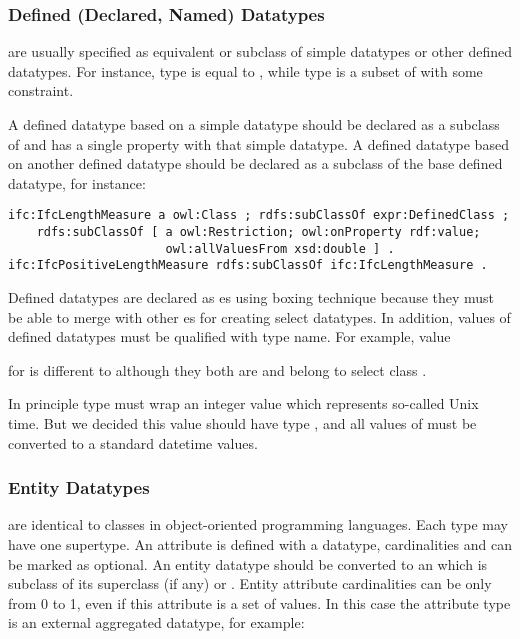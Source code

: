 \subsubsection{Defined (Declared, Named) Datatypes} are usually specified as equivalent or subclass of simple data\-types or other defined data\-types. For instance, type  is equal to , while type  is a subset of  with some constraint.

A defined data\-type based on a simple data\-type should be declared as a subclass of  and has a single property  with that simple data\-type. A defined data\-type based on another defined data\-type should be declared as a subclass of the base defined data\-type, for instance:

\begin{lstlisting}
ifc:IfcLengthMeasure a owl:Class ; rdfs:subClassOf expr:DefinedClass ;
    rdfs:subClassOf [ a owl:Restriction; owl:onProperty rdf:value;
                      owl:allValuesFrom xsd:double ] .
ifc:IfcPositiveLengthMeasure rdfs:subClassOf ifc:IfcLengthMeasure .
\end{lstlisting}


Defined data\-types are declared as es using boxing technique because they must be able to merge with other es for creating select data\-types. In addition, values of defined data\-types must be qualified with type name. For example, value  \TODO{}

for  is different to  although they both are  and belong to select class .

In principle type  must wrap an integer value which represents so-called Unix time. But we decided this value should have type , and all values of  must be converted to a standard datetime values.



\subsubsection{Entity Datatypes} are identical to classes in object-oriented programming languages. Each type may have one super\-type. An attribute is defined with a data\-type, cardinalities and can be marked as optional. An entity data\-type should be converted to an  which is subclass of its superclass (if any) or . Entity attribute cardinalities can be only from 0 to 1, even if this attribute is a set of values. In this case the attribute type is an external aggregated data\-type, for example:


